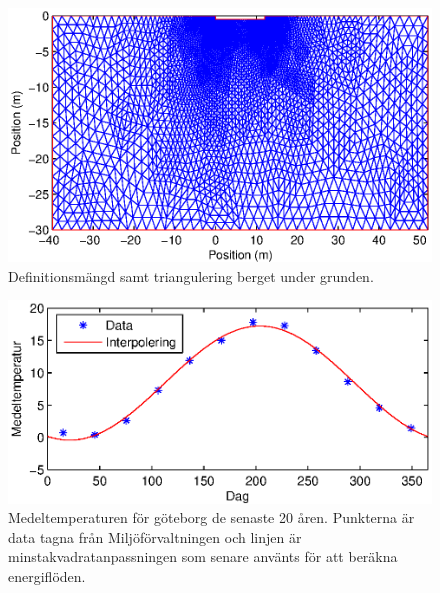 \begin{figure}
\centering
\includegraphics{images/trifoundation.eps}
\caption{Definitionsmängd samt triangulering berget under grunden.}
\label{fig:foundation:tri}
\end{figure}


\begin{figure}
\centering
\includegraphics{images/meantemperature.eps}
\caption{
Medeltemperaturen för göteborg de senaste 20 åren. Punkterna är data tagna från Miljöförvaltningen och linjen är minstakvadratanpassningen som senare använts för att beräkna energiflöden.}
\label{fig:foundation:meantemperature}
\end{figure}

